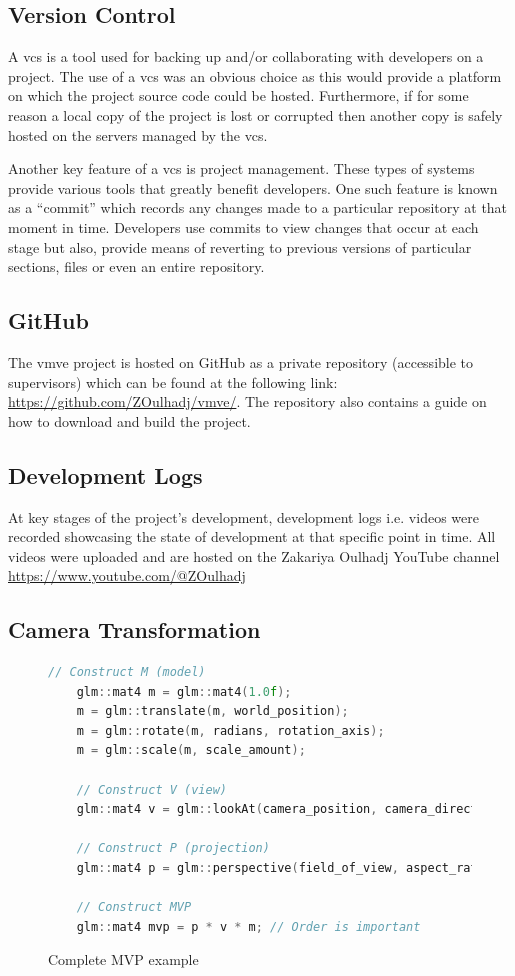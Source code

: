 \documentclass[11pt]{article}
\begin{document}
\subsection{Version Control} \label{version_control}
A \gls*{vcs} is a tool used for backing up and/or collaborating with developers
on a project. The use of a \gls*{vcs} was an obvious choice as this would
provide a platform on which the project source code could be hosted.
Furthermore, if for some reason a local copy of the project is lost or corrupted
then another copy is safely hosted on the servers managed by the \gls*{vcs}.

Another key feature of a \gls*{vcs} is project management. These types of
systems provide various tools that greatly benefit developers. One such feature
is known as a ``commit'' which records any changes made to a particular
repository at that moment in time. Developers use commits to view changes that
occur at each stage but also, provide means of reverting to previous versions of
particular sections, files or even an entire repository.


\subsection{GitHub} \label{github}
The \gls*{vmve} project is hosted on GitHub as a private repository (accessible
to supervisors) which can be found at the following link:
\url{https://github.com/ZOulhadj/vmve/}. The repository also contains a guide on
how to download and build the project.

\subsection{Development Logs}
At key stages of the project's development, development logs i.e. videos were
recorded showcasing the state of development at that specific point in time. All
videos were uploaded and are hosted on the Zakariya Oulhadj YouTube channel
\url{https://www.youtube.com/@ZOulhadj}

\subsection{Camera Transformation}
\begin{figure}[H]
  \centering
  \begin{lstlisting}[language=C++]
    // Construct M (model)
    glm::mat4 m = glm::mat4(1.0f);
    m = glm::translate(m, world_position);   
    m = glm::rotate(m, radians, rotation_axis); 
    m = glm::scale(m, scale_amount);

    // Construct V (view)
    glm::mat4 v = glm::lookAt(camera_position, camera_direction, camera_up);

    // Construct P (projection)
    glm::mat4 p = glm::perspective(field_of_view, aspect_ratio, near, far);

    // Construct MVP
    glm::mat4 mvp = p * v * m; // Order is important

  \end{lstlisting}
  \caption{Complete MVP example}
  \label{fig:local_to_world_appendix}
\end{figure}
\end{document}
